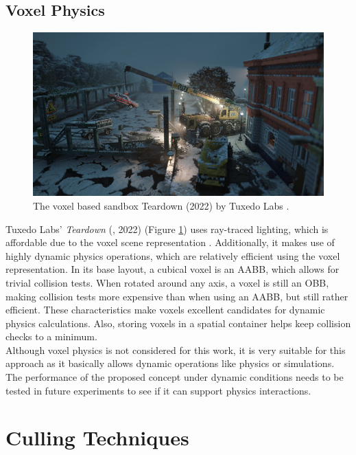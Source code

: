 \subsection*{Voxel Physics} \label{subsec-voxel-physics}

\begin{figure}[h]
    \centering
    \includegraphics[width=\linewidth]{images/graphics/teardown.jpg}
    \caption{The voxel based sandbox Teardown (2022) by Tuxedo Labs \cite{TuxedoLabs2022}.}
    \label{fig:teardown}
\end{figure}

\noindent
Tuxedo Labs' \emph{Teardown} (\cite{TeardownSteam2022}, 2022) (Figure \ref{fig:teardown}) uses ray-traced 
lighting, which is affordable due to the voxel scene representation \cite{TuxedoLabs2022}. Additionally, 
it makes use of highly dynamic physics operations, which are relatively efficient using the voxel representation. 
In its base layout, a cubical voxel is an \ac{AABB}, which allows for trivial collision tests. When rotated 
around any axis, a voxel is still an \ac{OBB}, making collision tests more expensive than when using an \ac{AABB}, 
but still rather efficient. These characteristics make voxels excellent candidates for dynamic physics 
calculations. Also, storing voxels in a spatial container helps keep collision checks to a minimum. \\

\noindent
Although voxel physics is not considered for this work, it is very suitable for this approach as it basically 
allows dynamic operations like physics or simulations. The performance of the proposed concept under dynamic 
conditions needs to be tested in future experiments to see if it can support physics interactions.


\section{Culling Techniques} \label{sec-culling-techniques}

